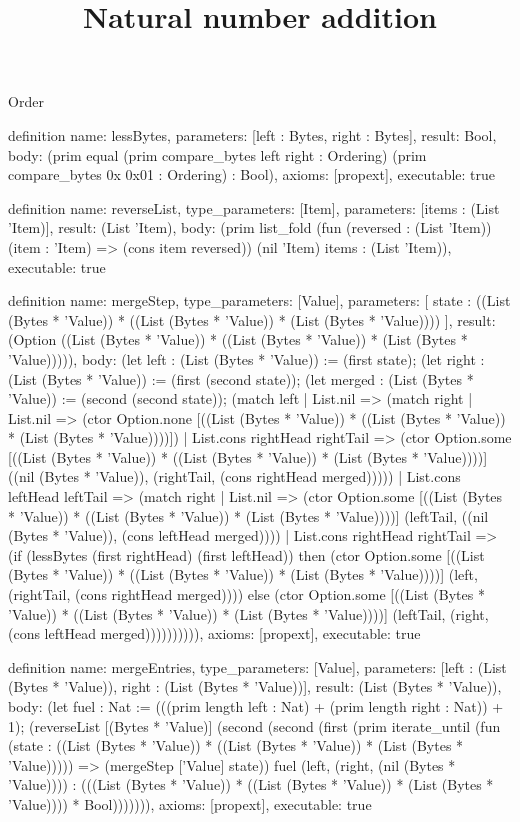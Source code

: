 \begin{lexlean}{Order}
\title{Natural number addition}
\begin{semanticmodule}
definition{
  name: lessBytes,
  parameters: [left : Bytes, right : Bytes],
  result: Bool,
  body: (prim equal (prim compare_bytes left right : Ordering) (prim compare_bytes 0x 0x01 : Ordering) : Bool),
  axioms: [propext],
  executable: true
}

definition{
  name: reverseList,
  type_parameters: [Item],
  parameters: [items : (List 'Item)],
  result: (List 'Item),
  body: (prim list_fold (fun (reversed : (List 'Item)) (item : 'Item) => (cons item reversed)) (nil 'Item) items : (List 'Item)),
  executable: true
}

definition{
  name: mergeStep,
  type_parameters: [Value],
  parameters: [
    state : ((List (Bytes * 'Value)) * ((List (Bytes * 'Value)) * (List (Bytes * 'Value))))
  ],
  result: (Option ((List (Bytes * 'Value)) * ((List (Bytes * 'Value)) * (List (Bytes * 'Value))))),
  body: (let left : (List (Bytes * 'Value)) := (first state); (let right : (List (Bytes * 'Value)) := (first (second state)); (let merged : (List (Bytes * 'Value)) := (second (second state)); (match left
    | List.nil => (match right
      | List.nil => (ctor Option.none [((List (Bytes * 'Value)) * ((List (Bytes * 'Value)) * (List (Bytes * 'Value))))])
      | List.cons rightHead rightTail => (ctor Option.some [((List (Bytes * 'Value)) * ((List (Bytes * 'Value)) * (List (Bytes * 'Value))))] ((nil (Bytes * 'Value)), (rightTail, (cons rightHead merged)))))
    | List.cons leftHead leftTail => (match right
      | List.nil => (ctor Option.some [((List (Bytes * 'Value)) * ((List (Bytes * 'Value)) * (List (Bytes * 'Value))))] (leftTail, ((nil (Bytes * 'Value)), (cons leftHead merged))))
      | List.cons rightHead rightTail => (if (lessBytes (first rightHead) (first leftHead)) then (ctor Option.some [((List (Bytes * 'Value)) * ((List (Bytes * 'Value)) * (List (Bytes * 'Value))))] (left, (rightTail, (cons rightHead merged)))) else (ctor Option.some [((List (Bytes * 'Value)) * ((List (Bytes * 'Value)) * (List (Bytes * 'Value))))] (leftTail, (right, (cons leftHead merged)))))))))),
  axioms: [propext],
  executable: true
}

definition{
  name: mergeEntries,
  type_parameters: [Value],
  parameters: [left : (List (Bytes * 'Value)), right : (List (Bytes * 'Value))],
  result: (List (Bytes * 'Value)),
  body: (let fuel : Nat := (((prim length left : Nat) + (prim length right : Nat)) + 1); (reverseList [(Bytes * 'Value)] (second (second (first (prim iterate_until (fun (state : ((List (Bytes * 'Value)) * ((List (Bytes * 'Value)) * (List (Bytes * 'Value))))) => (mergeStep ['Value] state)) fuel (left, (right, (nil (Bytes * 'Value)))) : (((List (Bytes * 'Value)) * ((List (Bytes * 'Value)) * (List (Bytes * 'Value)))) * Bool))))))),
  axioms: [propext],
  executable: true
}


\end{semanticmodule}
\end{lexlean}
